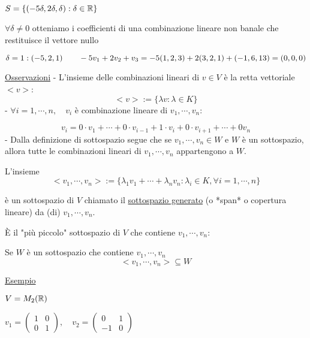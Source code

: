 \documentclass{article}
\begin{document}
   $S=\{(-5\delta,2\delta,\delta):\delta\in\mathbb{R}\}$

   $\forall\delta\not=0$ otteniamo i coefficienti di una combinazione lineare non banale che restituisce il vettore nullo

   $\delta=1:(-5,2,1)\\\qquad-5v_1+2v_2+v_3=-5(1,2,3)+2(3,2,1)+(-1,6,13)=(0,0,0)$

\ul{Osservazioni}
- L'insieme delle combinazioni lineari di $v\in V$ è la retta vettoriale $<v>$:
  $$<v>:=\{\lambda v:\lambda\in K\}$$
- $\forall i=1,\cdots,n,\quad v_i$ è combinazione lineare di $v_1,\cdots,v_n$:

  $$v_i=0\cdot v_1+\cdots+0\cdot v_{i-1}+1\cdot v_i+0\cdot v_{i+1}+\cdots+0v_n$$
- Dalla definizione di sottospazio segue che se $v_1,\cdots,v_n\in W$ e $W$ è un sottospazio, allora tutte le combinazioni lineari di $v_1,\cdots,v_n$ appartengono a $W$.

  L'insieme
  $$<v_1,\cdots,v_n>:=\{\lambda_1v_1+\cdots+\lambda_nv_n:\lambda_i\in K,\forall i=1,\cdots,n\}$$

  è un sottospazio di $V$ chiamato il \ul{sottospazio generato} (o *span* o copertura lineare) da (di) $v_1,\cdots,v_n$.

  È il "più piccolo" sottospazio di $V$ che contiene $v_1,\cdots,v_n$:

  Se $W$ è un sottospazio che contiene $v_1,\cdots,v_n$
  $$<v_1,\cdots,v_n>\subseteq W$$

  \ul{Esempio}

  $V=M_2(\mathbb{R})$

  $v_1=\begin{pmatrix}1&0\\0&1\end{pmatrix},\quad v_2=\begin{pmatrix}0&1\\-1&0\end{pmatrix}$
\end{document}
